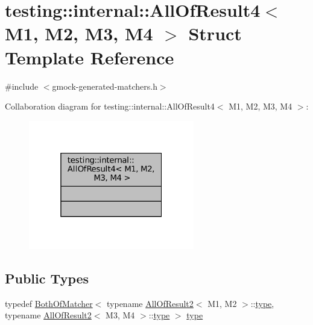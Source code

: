\hypertarget{structtesting_1_1internal_1_1AllOfResult4}{}\section{testing\+:\+:internal\+:\+:All\+Of\+Result4$<$ M1, M2, M3, M4 $>$ Struct Template Reference}
\label{structtesting_1_1internal_1_1AllOfResult4}


{\ttfamily \#include $<$gmock-\/generated-\/matchers.\+h$>$}



Collaboration diagram for testing\+:\+:internal\+:\+:All\+Of\+Result4$<$ M1, M2, M3, M4 $>$\+:
\nopagebreak
\begin{figure}[H]
\begin{center}
\leavevmode
\includegraphics[width=205pt]{structtesting_1_1internal_1_1AllOfResult4__coll__graph}
\end{center}
\end{figure}
\subsection*{Public Types}
\begin{DoxyCompactItemize}
\item 
typedef \hyperlink{classtesting_1_1internal_1_1BothOfMatcher}{Both\+Of\+Matcher}$<$ typename \hyperlink{structtesting_1_1internal_1_1AllOfResult2}{All\+Of\+Result2}$<$ M1, M2 $>$\+::\hyperlink{structtesting_1_1internal_1_1AllOfResult4_ab277e20178bac632d4e5a39a1a407bbf}{type}, typename \hyperlink{structtesting_1_1internal_1_1AllOfResult2}{All\+Of\+Result2}$<$ M3, M4 $>$\+::\hyperlink{structtesting_1_1internal_1_1AllOfResult4_ab277e20178bac632d4e5a39a1a407bbf}{type} $>$ \hyperlink{structtesting_1_1internal_1_1AllOfResult4_ab277e20178bac632d4e5a39a1a407bbf}{type}
\end{DoxyCompactItemize}


